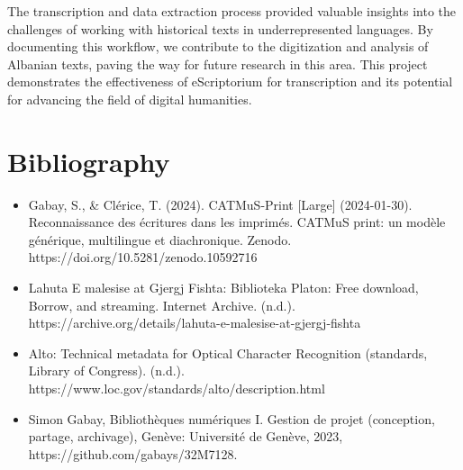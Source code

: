 \documentclass[12pt]{article}
\begin{document}
The transcription and data extraction process provided valuable insights into the challenges of working with historical texts in underrepresented languages. By documenting this workflow, we contribute to the digitization and analysis of Albanian texts, paving the way for future research in this area. This project demonstrates the effectiveness of eScriptorium for transcription and its potential for advancing the field of digital humanities.

\newpage

\section*{Bibliography}
\begin{itemize}
    \item Gabay, S., \& Clérice, T. (2024). CATMuS-Print [Large] (2024-01-30). Reconnaissance des écritures dans les imprimés. CATMuS print: un modèle générique, multilingue et diachronique. Zenodo. https://doi.org/10.5281/zenodo.10592716
    \item Lahuta E malesise at Gjergj Fishta: Biblioteka Platon: Free download, Borrow, and streaming. Internet Archive. (n.d.). https://archive.org/details/lahuta-e-malesise-at-gjergj-fishta 
    \item Alto: Technical metadata for Optical Character Recognition (standards, Library of Congress). (n.d.). https://www.loc.gov/standards/alto/description.html 
    \item Simon Gabay, Bibliothèques numériques I. Gestion de projet (conception, partage, archivage), Genève: Université de Genève, 2023, https://github.com/gabays/32M7128.
\end{itemize}
\end{document}
